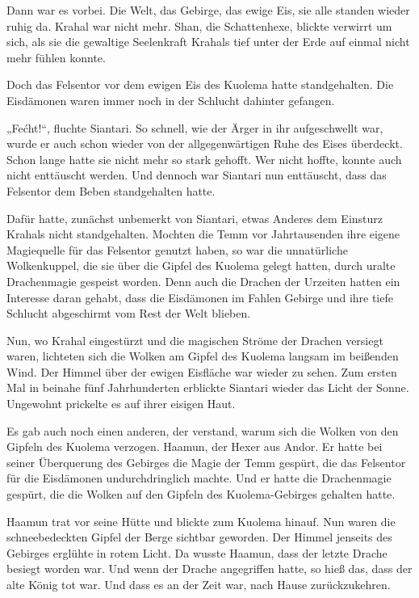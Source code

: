 Dann war es vorbei. Die Welt, das Gebirge, das ewige Eis, sie alle standen wieder ruhig da. Krahal war nicht mehr. Shan, die Schattenhexe, blickte verwirrt um sich, als sie die gewaltige Seelenkraft Krahals tief unter der Erde auf einmal nicht mehr fühlen konnte.

Doch das Felsentor vor dem ewigen Eis des Kuolema hatte standgehalten. Die Eisdämonen waren immer noch in der Schlucht dahinter gefangen.

„Fećht!“, fluchte Siantari. So schnell, wie der Ärger in ihr aufgeschwellt war, wurde er auch schon wieder von der allgegenwärtigen Ruhe des Eises überdeckt. Schon lange hatte sie nicht mehr so stark gehofft. Wer nicht hoffte, konnte auch nicht enttäuscht werden. Und dennoch war Siantari nun enttäuscht, dass das Felsentor dem Beben standgehalten hatte.

Dafür hatte, zunächst unbemerkt von Siantari, etwas Anderes dem Einsturz Krahals nicht standgehalten. Mochten die Temm vor Jahrtausenden ihre eigene Magiequelle für das Felsentor genutzt haben, so war die unnatürliche Wolkenkuppel, die sie über die Gipfel des Kuolema gelegt hatten, durch uralte Drachenmagie gespeist worden. Denn auch die Drachen der Urzeiten hatten ein Interesse daran gehabt, dass die Eisdämonen im Fahlen Gebirge und ihre tiefe Schlucht abgeschirmt vom Rest der Welt blieben.

Nun, wo Krahal eingestürzt und die magischen Ströme der Drachen versiegt waren, lichteten sich die Wolken am Gipfel des Kuolema langsam im beißenden Wind. Der Himmel über der ewigen Eisfläche war wieder zu sehen. Zum ersten Mal in beinahe fünf Jahrhunderten erblickte Siantari wieder das Licht der Sonne. Ungewohnt prickelte es auf ihrer eisigen Haut.\bigskip







Es gab auch noch einen anderen, der verstand, warum sich die Wolken von den Gipfeln des Kuolema verzogen. Haamun, der Hexer aus Andor. Er hatte bei seiner Überquerung des Gebirges die Magie der Temm gespürt, die das Felsentor für die Eisdämonen undurchdringlich machte. Und er hatte die Drachenmagie gespürt, die die Wolken auf den Gipfeln des Kuolema-Gebirges gehalten hatte.

Haamun trat vor seine Hütte und blickte zum Kuolema hinauf. Nun waren die schneebedeckten Gipfel der Berge sichtbar geworden. Der Himmel jenseits des Gebirges erglühte in rotem Licht. Da wusste Haamun, dass der letzte Drache besiegt worden war. Und wenn der Drache angegriffen hatte, so hieß das, dass der alte König tot war. Und dass es an der Zeit war, nach Hause zurückzukehren.


